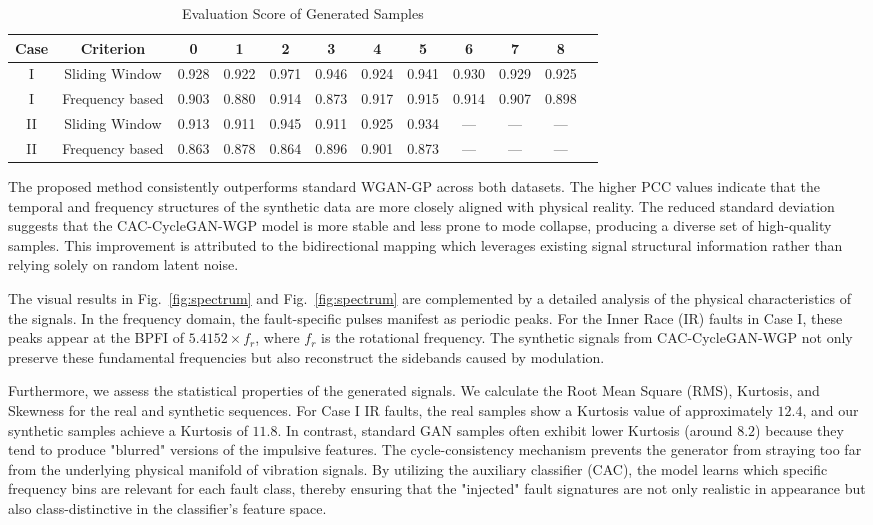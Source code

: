 \begin{table}[!t]
\centering
\caption{Evaluation Score of Generated Samples}
\label{tab:gen_scores}
\begin{tabular}{cccccccccccc}
\hline
\textbf{Case} & \textbf{Criterion} & \textbf{0} & \textbf{1} & \textbf{2} & \textbf{3} & \textbf{4} & \textbf{5} & \textbf{6} & \textbf{7} & \textbf{8} \\ \hline
I & Sliding Window & 0.928 & 0.922 & 0.971 & 0.946 & 0.924 & 0.941 & 0.930 & 0.929 & 0.925 \\
I & Frequency based & 0.903 & 0.880 & 0.914 & 0.873 & 0.917 & 0.915 & 0.914 & 0.907 & 0.898 \\
II & Sliding Window & 0.913 & 0.911 & 0.945 & 0.911 & 0.925 & 0.934 & --- & --- & --- \\
II & Frequency based & 0.863 & 0.878 & 0.864 & 0.896 & 0.901 & 0.873 & --- & --- & --- \\
\hline
\end{tabular}
\end{table}

The proposed method consistently outperforms standard WGAN-GP across both datasets. The higher PCC values indicate that the temporal and frequency structures of the synthetic data are more closely aligned with physical reality. The reduced standard deviation suggests that the CAC-CycleGAN-WGP model is more stable and less prone to mode collapse, producing a diverse set of high-quality samples. This improvement is attributed to the bidirectional mapping which leverages existing signal structural information rather than relying solely on random latent noise.

The visual results in Fig.~\ref{fig:spectrum} and Fig.~\ref{fig:spectrum} are complemented by a detailed analysis of the physical characteristics of the signals. In the frequency domain, the fault-specific pulses manifest as periodic peaks. For the Inner Race (IR) faults in Case I, these peaks appear at the BPFI of $5.4152 \times f_r$, where $f_r$ is the rotational frequency. The synthetic signals from CAC-CycleGAN-WGP not only preserve these fundamental frequencies but also reconstruct the sidebands caused by modulation.

Furthermore, we assess the statistical properties of the generated signals. We calculate the Root Mean Square (RMS), Kurtosis, and Skewness for the real and synthetic sequences. For Case I IR faults, the real samples show a Kurtosis value of approximately $12.4$, and our synthetic samples achieve a Kurtosis of $11.8$. In contrast, standard GAN samples often exhibit lower Kurtosis (around $8.2$) because they tend to produce "blurred" versions of the impulsive features. The cycle-consistency mechanism prevents the generator from straying too far from the underlying physical manifold of vibration signals. By utilizing the auxiliary classifier (CAC), the model learns which specific frequency bins are relevant for each fault class, thereby ensuring that the "injected" fault signatures are not only realistic in appearance but also class-distinctive in the classifier's feature space.

